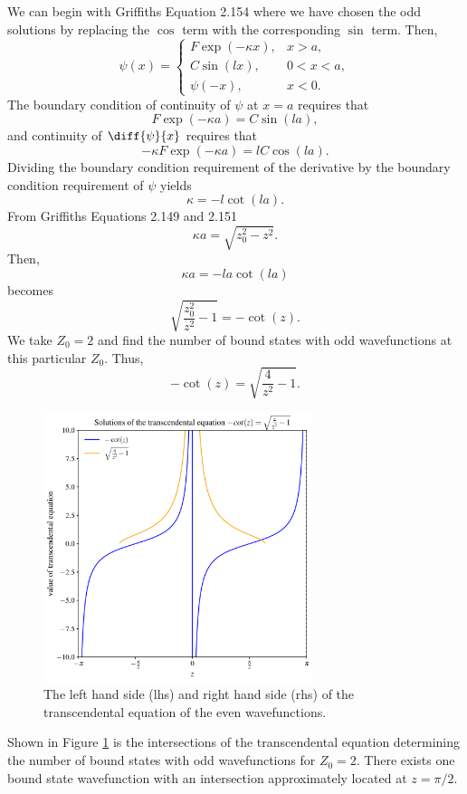 \documentclass[a4paper, 12pt]{config/homework}
\begin{document}
\begin{enumerate}
We can begin with Griffiths Equation 2.154 where we have chosen the odd solutions by replacing the \(\cos\) term with the corresponding \(\sin\) term. Then,
\[\psi(x) = \begin{cases}
F\exp(-\kappa x), & x > a, \\ C\sin(lx), & 0 < x < a, \\ \psi(-x), & x < 0.
\end{cases}\]
The boundary condition of continuity of \(\psi\) at \(x=a\) requires that
\[F\exp(-\kappa a) = C\sin(la),\]
and continuity of \(\diff{\psi}{x}\) requires that
\[-\kappa F \exp(-\kappa a) = l C \cos(la).\]
Dividing the boundary condition requirement of the derivative by the boundary condition requirement of \(\psi\) yields
\[\kappa = -l\cot(la).\]
From Griffiths Equations 2.149 and 2.151
\[\kappa a = \sqrt{z_0^2 - z^2}.\]
Then,
\[\kappa a = - la \cot(la)\]
becomes
\[\sqrt{\frac{z_0^2}{z^2} - 1} = -\cot(z).\]
We take \(Z_0=2\) and find the number of bound states with odd wavefunctions at this particular \(Z_0\). Thus,
\[-\cot(z) = \sqrt{\frac{4}{z^2}-1}.\]
\begin{figure}[H]
    \centering
    \includegraphics[width=0.7\textwidth]{figures/transcendental_equation.pdf}
    \caption{The left hand side (lhs) and right hand side (rhs) of the transcendental equation of the even wavefunctions.}
    \label{fig:tran}
\end{figure}
Shown in Figure \ref{fig:tran} is the intersections of the transcendental equation determining the number of bound states with odd wavefunctions for \(Z_0=2\). There exists one bound state wavefunction with an intersection approximately located at \(z=\pi/2\).


\end{enumerate}
\end{document}
